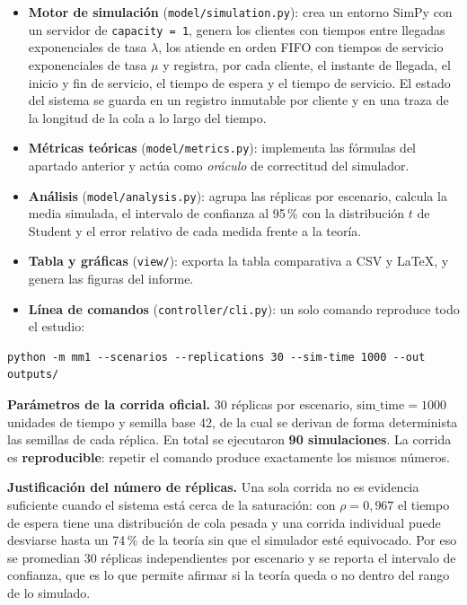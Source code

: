 \documentclass[11pt,a4paper]{article}
\begin{document}
\begin{itemize}
    \item \textbf{Motor de simulación} (\texttt{model/simulation.py}): crea un entorno
    SimPy con un servidor de \texttt{capacity = 1}, genera los clientes con tiempos
    entre llegadas exponenciales de tasa $\lambda$, los atiende en orden FIFO con
    tiempos de servicio exponenciales de tasa $\mu$ y registra, por cada cliente, el
    instante de llegada, el inicio y fin de servicio, el tiempo de espera y el tiempo
    de servicio. El estado del sistema se guarda en un registro inmutable por cliente
    y en una traza de la longitud de la cola a lo largo del tiempo.
    \item \textbf{Métricas teóricas} (\texttt{model/metrics.py}): implementa las
    fórmulas del apartado anterior y actúa como \emph{oráculo} de correctitud del
    simulador.
    \item \textbf{Análisis} (\texttt{model/analysis.py}): agrupa las réplicas por
    escenario, calcula la media simulada, el intervalo de confianza al 95\,\% con la
    distribución $t$ de Student y el error relativo de cada medida frente a la teoría.
    \item \textbf{Tabla y gráficas} (\texttt{view/}): exporta la tabla comparativa a
    CSV y LaTeX, y genera las figuras del informe.
    \item \textbf{Línea de comandos} (\texttt{controller/cli.py}): un solo comando
    reproduce todo el estudio:
\end{itemize}

\begin{verbatim}
python -m mm1 --scenarios --replications 30 --sim-time 1000 --out outputs/
\end{verbatim}

\noindent\textbf{Parámetros de la corrida oficial.} 30 réplicas por escenario,
$\text{sim\_time} = 1000$ unidades de tiempo y semilla base 42, de la cual se derivan
de forma determinista las semillas de cada réplica. En total se ejecutaron
\textbf{90 simulaciones}. La corrida es \textbf{reproducible}: repetir el comando
produce exactamente los mismos números.

\noindent\textbf{Justificación del número de réplicas.} Una sola corrida no es
evidencia suficiente cuando el sistema está cerca de la saturación: con $\rho = 0{,}967$
el tiempo de espera tiene una distribución de cola pesada y una corrida individual
puede desviarse hasta un 74\,\% de la teoría sin que el simulador esté equivocado. Por
eso se promedian 30 réplicas independientes por escenario y se reporta el intervalo de
confianza, que es lo que permite afirmar si la teoría queda o no dentro del rango de lo
simulado.
\end{document}
